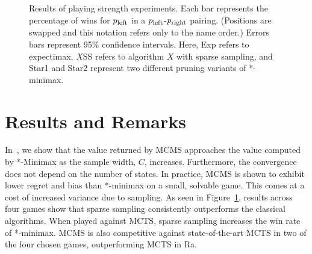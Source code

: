 \documentclass{article}
\newcommand{\mcts}{\textsc{mcts}}
\newcommand{\expecti}{exp}
\newcommand{\expss}{exp\textsc{ss}}
\newcommand{\starone}{Star1}
\newcommand{\startwo}{Star2}
\newcommand{\staroness}{star1\textsc{ss}}
\newcommand{\startwoss}{star2\textsc{ss}}
\begin{document}
\begin{figure}[h]
  \caption{Results of playing strength experiments.
    Each bar represents the percentage of wins for $p_{\text{\footnotesize left}}$ in a 
    $p_{\text{\footnotesize left}}$-$p_{\text{\footnotesize right}}$ pairing. 
    (Positions are swapped and this notation refers only to the name order.)
    Errors bars represent 95\% confidence intervals. 
    Here, %
    Exp refers to expectimax, $X$SS refers to algorithm $X$ with sparse sampling, and Star1 and Star2 represent two 
    different pruning variants of *-minimax.
    \label{fig:perf}}
\end{figure}

\section{Results and Remarks}

In~\cite{Lanctot13MCMS}, we show that the value returned by MCMS approaches the value computed 
by *-Minimax as the sample width, $C$, increases. 
Furthermore, the convergence does not depend on the number of states. 
In practice, MCMS is shown to exhibit lower regret and bias than *-minimax on a small, solvable game. 
This comes at a cost of increased variance due to sampling. 
As seen in Figure~\ref{fig:perf}, results across four games show that sparse sampling consistently outperforms 
the classical algorithms. When played against MCTS, sparse sampling increases the win rate of *-minimax. 
MCMS is also competitive against state-of-the-art MCTS in two of the four chosen games, outperforming 
MCTS in Ra. 



\end{document}
